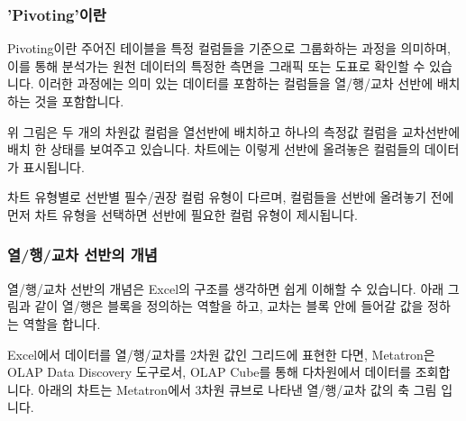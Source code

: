 \documentclass[letterpaper,10pt,english]{sphinxmanual}
\begin{document}
\subsubsection{'Pivoting'이란}
\label{\detokenize{discovery/part04/pivoting:id1}}
Pivoting이란 주어진 테이블을 특정 컬럼들을 기준으로 그룹화하는 과정을 의미하며, 이를 통해 분석가는 원천 데이터의 특정한 측면을 그래픽 또는 도표로 확인할 수 있습니다.
이러한 과정에는 의미 있는 데이터를 포함하는 컬럼들을 열/행/교차 선반에 배치하는 것을 포함합니다.
\begin{quote}

\begin{figure}[H]
\centering

\noindent{}
\end{figure}
\end{quote}

위 그림은 두 개의 차원값 컬럼을 열선반에 배치하고 하나의 측정값 컬럼을 교차선반에 배치 한 상태를 보여주고 있습니다.
차트에는 이렇게 선반에 올려놓은 컬럼들의 데이터가 표시됩니다.

차트 유형별로 선반별 필수/권장 컬럼 유형이 다르며, 컬럼들을 선반에 올려놓기 전에 먼저 차트 유형을 선택하면 선반에 필요한 컬럼 유형이 제시됩니다.
\begin{quote}

\begin{figure}[H]
\centering

\noindent{}
\end{figure}
\end{quote}


\subsubsection{열/행/교차 선반의 개념}
\label{\detokenize{discovery/part04/pivoting:id2}}
열/행/교차 선반의 개념은 Excel의 구조를 생각하면 쉽게 이해할 수 있습니다. 아래 그림과 같이 열/행은 블록을 정의하는 역할을 하고, 교차는 블록 안에 들어갈 값을 정하는 역할을 합니다.
\begin{quote}

\begin{figure}[H]
\centering

\noindent{}
\end{figure}
\end{quote}

Excel에서 데이터를 열/행/교차를 2차원 값인 그리드에 표현한 다면, Metatron은 OLAP Data Discovery 도구로서, OLAP Cube를 통해 다차원에서 데이터를 조회합니다.
아래의 차트는 Metatron에서 3차원 큐브로 나타낸 열/행/교차 값의 축 그림 입니다.
\begin{quote}

\begin{figure}[H]
\centering

\noindent{}
\end{figure}
\end{quote}
\end{document}
